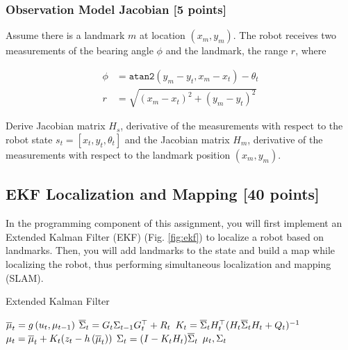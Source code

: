 \documentclass[tp]{lcc}
\begin{document}
\subsubsection{Observation Model Jacobian [5 points]}
Assume there is a landmark $m$ at location $(x_{m},y_{m})$. The robot receives two measurements of the bearing angle $\phi$ and the landmark, the range $r$, where

\begin{align*}
    \phi &= \texttt{atan2}(y_{m}-y_{t},x_{m}-x_{t})-\theta_{t} \\
    r &= \sqrt{(x_{m}-x_{t})^{2}+(y_{m}-y_{t})^{2}}
\end{align*}

Derive Jacobian matrix $H_{s}$, derivative of the measurements with respect to the robot state $s_{t}=[x_{t},y_{t},\theta_{t}]$ and the Jacobian matrix $H_{m}$, derivative of the measurements with respect to the landmark position $(x_{m},y_{m})$.

\subsection{EKF Localization and Mapping [40 points]}
In the programming component of this assignment, you will first implement an Extended Kalman Filter (EKF) (Fig. \ref{fig:ekf}) to localize a robot based on landmarks. Then, you will add landmarks to the state and build a map while localizing the robot, thus performing simultaneous localization and mapping (SLAM).


\begin{algorithm}
    \caption{Extended Kalman Filter}
    \begin{algorithmic}[1]
            \State $\overline{\mu}_{t} = g\left( u_{t}, \mu_{t-1} \right)$
            \State $\overline{\Sigma}_{t} = G_{t} \Sigma_{t-1} G_{t}^{\top}+R_{t}$
            \Statex
            \State $K_{t} = \overline{\Sigma}_{t} H_{t}^{\top} (H_{t} \overline{\Sigma}_{t}  H_{t} + Q_{t})^{-1} $
            \State $\mu_{t} = \overline{\mu}_{t} + K_{t} (z_{t} - h\left( \overline{\mu}_{t} \right))$
            \State $\Sigma_{t} =  (I - K_{t} H_{t}) \overline{\Sigma}_{t}$
            \State \Return $\mu_{t}, \Sigma_{t}$
        \EndProcedure
    \end{algorithmic}
\end{algorithm}
\end{document}
